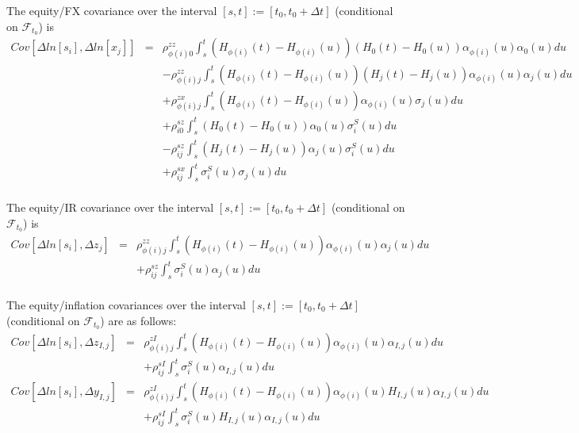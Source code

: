 \documentclass[12pt, a4paper]{article}
\begin{document}
{\begin{appendix}
The equity/FX covariance over the interval $[s,t] := [t_0, t_0+\Delta t]$ (conditional on $\mathcal{F}_{t_0}$) is
\begin{eqnarray*}
	Cov \left[\Delta ln[s_i], \Delta ln[x_j] \right] &=&
	\rho_{\phi(i)0}^{zz} \int_s^t (H_{\phi(i)} (t) - H_{\phi(i)} (u)) (H_0 (t) - H_0 (u)) \alpha_{\phi(i)}(u) 
	\alpha_0(u) 
	du\\
	&& - \rho_{\phi(i)j}^{zz} \int_s^t (H_{\phi(i)} (t) - H_{\phi(i)} (u)) (H_j (t) - H_j (u)) \alpha_{\phi(i)} 
	(u)\alpha_j(u) du\\
	&& + \rho_{\phi(i)j}^{zx} \int_s^t (H_{\phi(i)} (t) - H_{\phi(i)} (u)) \alpha_{\phi(i)} (u) \sigma_j(u) du\\
	&&+ \rho_{i0}^{sz} \int_s^t (H_0 (t) - H_0 (u)) \alpha_0 (u) \sigma_i^S(u) du\\
	&&- \rho_{ij}^{sz} \int_s^t (H_j (t) - H_j (u)) \alpha_j (u) \sigma_i^S(u) du\\
	&&+ \rho_{ij}^{sx} \int_s^t \sigma_i^S(u) \sigma_j(u) du\\
\end{eqnarray*}

The equity/IR covariance over the interval $[s,t] := [t_0, t_0+\Delta t]$ (conditional on $\mathcal{F}_{t_0}$) is
\begin{eqnarray*}
	Cov \left[\Delta ln[s_i], \Delta z_j \right] &=&
	\rho_{\phi(i)j}^{zz} \int_s^t (H_{\phi(i)} (t) - H_{\phi(i)} (u)) \alpha_{\phi(i)} (u) \alpha_j (u) du\\
	&&+ \rho_{ij}^{sz} \int_s^t \sigma_i^S (u) \alpha_j (u) du\\
\end{eqnarray*}

The equity/inflation covariances over the interval $[s,t] := [t_0, t_0+\Delta t]$ (conditional on $\mathcal{F}_{t_0}$) are as follows:
\begin{eqnarray*}
	Cov \left[\Delta ln[s_i], \Delta z_{I,j} \right] &=&
	\rho_{\phi(i)j}^{zI} \int_s^t (H_{\phi(i)} (t) - H_{\phi(i)} (u)) \alpha_{\phi(i)} (u) \alpha_{I,j} (u) du\\
	&&+ \rho_{ij}^{sI} \int_s^t \sigma_i^S (u) \alpha_{I,j} (u) du\\	
	Cov \left[\Delta ln[s_i], \Delta y_{I,j} \right] &=&
	\rho_{\phi(i)j}^{zI} \int_s^t (H_{\phi(i)} (t) - H_{\phi(i)} (u)) \alpha_{\phi(i)} (u) H_{I,j} (u) \alpha_{I,j} (u) du\\
	&&+ \rho_{ij}^{sI} \int_s^t \sigma_i^S (u) H_{I,j} (u) \alpha_{I,j} (u) du\\
\end{eqnarray*}


\end{appendix}}
\end{document}
